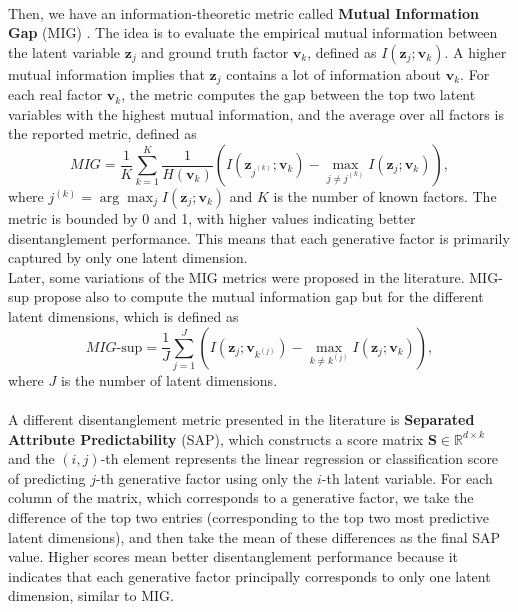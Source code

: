 \\
Then, we have an information-theoretic metric called \textbf{Mutual Information Gap} (MIG) \cite{chen2019isolatingsourcesdisentanglementvariational}. The idea is to evaluate the empirical mutual information between the latent variable $\mathbf{z}_j$ and ground truth factor $\mathbf{v}_k$, defined as $I(\mathbf{z}_j;\mathbf{v}_k)$. A higher mutual information implies that $\mathbf{z}_j$ contains a lot of information about $\mathbf{v}_k$. For each real factor $\mathbf{v}_k$, the metric computes the gap between the top two latent variables with the highest mutual information, and the average over all factors is the reported metric, defined as 
\begin{equation}
    MIG = \frac{1}{K}\sum_{k=1}^K \frac{1}{H(\mathbf{v}_k)} \left( I(\mathbf{z}_{j^{(k)}};\mathbf{v}_k) - \max_{j\neq j^{(k)}} I(\mathbf{z}_j; \mathbf{v}_k) \right),
\end{equation}
where $j^{(k)}=\arg\max_j I(\mathbf{z}_j;\mathbf{v}_k)$ and $K$ is the number of known factors. The metric is bounded by 0 and 1, with higher values indicating better disentanglement performance. This means that each generative factor is primarily captured by only one latent dimension. \\
Later, some variations of the MIG metrics were proposed in the literature. MIG-sup \cite{li2020progressivelearningdisentanglementhierarchical} propose also to compute the mutual information gap but for the different latent dimensions, which is defined as 
\begin{equation}
    MIG\text {-sup} = \frac{1}{J}\sum_{j=1}^J \left( I(\mathbf{z}_{j};\mathbf{v}_{k^{(j)}}) - \max_{k\neq k^{(j)}} I(\mathbf{z}_j; \mathbf{v}_k) \right),
\end{equation}
where $J$ is the number of latent dimensions. \\
\\
A different disentanglement metric presented in the literature is \textbf{Separated Attribute Predictability} (SAP), which constructs a score matrix $\mathbf{S}\in\mathbb{R}^{d\times k}$ and the $(i,j)$-th element represents the linear regression or classification score of predicting $j$-th generative factor using only the $i$-th latent variable. For each column of the matrix, which corresponds to a generative factor, we take the difference of the top two entries (corresponding to the top two most predictive latent dimensions), and then take the mean of these differences as the final SAP value. Higher scores mean better disentanglement performance because it indicates that each generative factor principally corresponds to only one latent dimension, similar to MIG. \\
